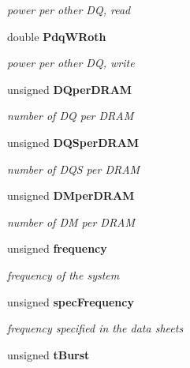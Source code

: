 \begin{CompactItemize}
\begin{CompactList}\small\item\em power per other DQ, read \item\end{CompactList}\item 
double {\bf PdqWRoth}\label{class_d_r_a_m_sim_i_i_1_1power_config_a0e1cab1d30dfc58e0547a5cf8185e17}

\begin{CompactList}\small\item\em power per other DQ, write \item\end{CompactList}\item 
unsigned {\bf DQperDRAM}\label{class_d_r_a_m_sim_i_i_1_1power_config_4a9173ab68d56ed6b7a95ea7aa826e0b}

\begin{CompactList}\small\item\em number of DQ per DRAM \item\end{CompactList}\item 
unsigned {\bf DQSperDRAM}\label{class_d_r_a_m_sim_i_i_1_1power_config_3fb6658eace901067026f6cfc4520d33}

\begin{CompactList}\small\item\em number of DQS per DRAM \item\end{CompactList}\item 
unsigned {\bf DMperDRAM}\label{class_d_r_a_m_sim_i_i_1_1power_config_3748787d7cd11c1828833ad8611ace40}

\begin{CompactList}\small\item\em number of DM per DRAM \item\end{CompactList}\item 
unsigned {\bf frequency}\label{class_d_r_a_m_sim_i_i_1_1power_config_a5279ed2087738a8b993878bf0e2c021}

\begin{CompactList}\small\item\em frequency of the system \item\end{CompactList}\item 
unsigned {\bf specFrequency}\label{class_d_r_a_m_sim_i_i_1_1power_config_0a098fab1b2bbcc242ed71cd37a2cb5c}

\begin{CompactList}\small\item\em frequency specified in the data sheets \item\end{CompactList}\item 
unsigned {\bf tBurst}\label{class_d_r_a_m_sim_i_i_1_1power_config_db5c4ef7e8fba33e95cca5894ecab395}


\end{CompactItemize}
